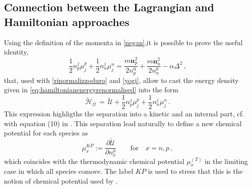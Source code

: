 \documentclass[usenatbib]{mnras}
\newcommand{\vect}[1]{\mathbf{{#1}}}
\begin{document}
\subsection{Connection between the Lagrangian and Hamiltonian approaches}


Using the definition of the momenta in  \eqref{negan},it is possible to prove the  useful identity,
%
\begin{equation}
\label{useful} 
 \dfrac{1}{2} n_p^j \mu_{j}^p + \dfrac{1}{2} n_n^j \mu_{j}^n = \dfrac{m  \vect{n}_p^2}{2 n_p^0} + \dfrac{m  \vect{n}_n^2}{2 n_n^0} - \alpha \Delta^2  \, ,
\end{equation}
%
that, used with   \eqref{rinormalizzoduro} and \eqref{yogi}, allow to cast the energy density given in \eqref{eq:hamiltonianenergyrenormalised}  into the form
%
\begin{equation}
\label{chespettacoloragazzi!}
\tilde{\mathcal{H}}_\mathcal{O}
\, = \, 
\tilde{\mathcal{U}} + \dfrac{1}{2}  n_p^j \mu_{j}^p + \dfrac{1}{2} n_n^j \mu_{j}^n \, .
\end{equation}
%
This expression highligths the separation into a kinetic and an internal part, cf. with equation (10) in \cite{KP2017}. This separation lead naturally to define a new chemical potential for each species as
%
\begin{equation}
\mu_x^{KP} := \dfrac{\partial \tilde{\mathcal{U}}}{\partial n_x^0} 
\qquad
\text{for}
\quad
 x=n,p
\, ,
\end{equation}
% 
which coincides with the thermodynamic chemical potential $\mu_x^{(T)}$ in the limiting case in which all species comove. The label $KP$ is used to stress that this is the notion of chemical potential used by \cite{KP2017}.
\end{document}
